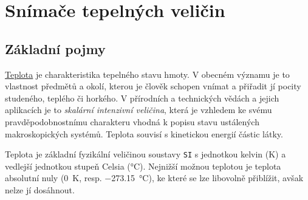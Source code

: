\setchaptertoc
\chapter{Snímače tepelných veličin}


  \section{Základní pojmy}
    \href{http://cs.wikipedia.org/wiki/Teplota}{Teplota} je charakteristika tepelného stavu hmoty.
    V obecném významu je to vlastnost předmětů a okolí, kterou je člověk schopen vnímat a přiřadit
    jí pocity studeného, teplého či horkého. V přírodních a technických vědách a jejich aplikacích
    je to \emph{skalární intenzivní veličina}, která je vzhledem ke svému pravděpodobnostnímu
    charakteru vhodná k popisu stavu ustálených makroskopických systémů. Teplota souvisí s
    kinetickou energií částic látky.

    Teplota je základní fyzikální veličinou soustavy \texttt{SI} s jednotkou kelvin (\si{\kelvin})
    a vedlejší jednotkou stupeň Celsia (\si{\degreeCelsius}). Nejnižší možnou teplotou je teplota
    absolutní nuly (\SI{0}{\kelvin}, resp. \SI{-273.15}{\degreeCelsius}), ke které se lze 
    libovolně
    přiblížit, avšak nelze jí dosáhnout.
         
